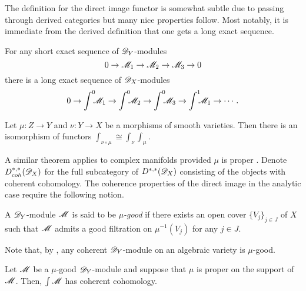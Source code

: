 The definition for the direct image functor is somewhat subtle due to passing through derived categories but many nice properties follow.
Most notably, it is immediate from the derived definition that one gets a long exact sequence.
\begin{proposition}
    For any short exact sequence of $\mathscr{D}_Y$-modules
    $$0 \to \mathscr{M}_1 \to \mathscr{M}_2 \to \mathscr{M}_3 \to 0 $$
    there is a long exact sequence of $\mathscr{D}_X$-modules
    $$0 \to \int^0 \mkern -8mu\mathscr{M}_1 \to\int^0 \mkern -8mu \mathscr{M}_2 \to \int^0 \mkern -8mu \mathscr{M}_3 \to \int^1 \mkern -8mu \mathscr{M}_1 \to \cdots.$$
\end{proposition}
\begin{proposition}{\cite[Chapter VI, Section 5]{borel1987algebraic}}
  Let $\mu:Z\to Y$ and $\nu:Y\to X$ be a morphisms of smooth varieties.
  Then there is an isomorphism of functors $\int_{\nu\circ \mu} \cong \int_\nu \int_\mu$.
\end{proposition}
A similar theorem applies to complex manifolds provided $\mu$ is proper \cite[Theorem 3.3.6]{sabbah2011introduction}.
Denote $D_{coh}^{*,*}(\mathscr{D}_X)$ for the full subcategory of $D^{*,*}(\mathscr{D}_X)$ consisting of the objects with coherent cohomology.
The coherence properties of the direct image in the analytic case require the following notion.
\begin{definition}
  A $\mathscr{D}_Y$-module $\mathscr{M}$ is said to be {\it $\mu$-good} if there exists an open cover $\{V_j\}_{j\in J}$ of $X$ such that $\mathscr{M}$ admits a good filtration on $\mu^{-1}(V_j)$ for any $j\in J$.
\end{definition}
Note that, by , any coherent $\mathscr{D}_Y$-module on an algebraic variety is $\mu$-good.
\begin{theorem}{\cite[Theorem 3.4.1.]{sabbah2011introduction}}\label{thm: MuGoodCoherent}
  Let $\mathscr{M}$ be a $\mu$-good $\mathscr{D}_Y$-module and suppose that $\mu$ is proper on the support of $\mathscr{M}$.
  Then, $\int \mathscr{M}$ has coherent cohomology.
\end{theorem}
